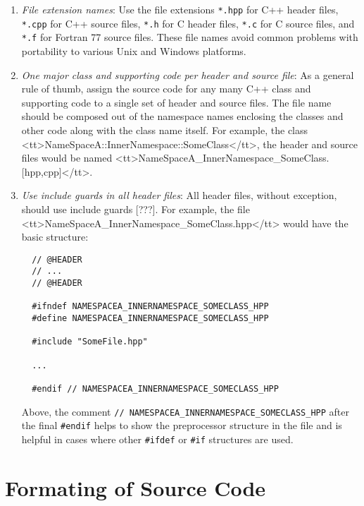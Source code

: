 \begin{enumerate}

{}\item\textit{File extension names}: Use the file extensions {}\texttt{*.hpp}
for C++ header files, {}\texttt{*.cpp} for C++ source files, {}\texttt{*.h}
for C header files, {}\texttt{*.c} for C source files, and {}\texttt{*.f} for
Fortran 77 source files.  These file names avoid common problems with
portability to various Unix and Windows platforms.

{}\item\textit{One major class and supporting code per header and source
file}: As a general rule of thumb, assign the source code for any many C++
class and supporting code to a single set of header and source files.  The
file name should be composed out of the namespace names enclosing the classes
and other code along with the class name itself.  For example, the class
<tt>NameSpaceA\-::InnerNamespace\-::SomeClass</tt>, the header and source
files would be named
<tt>NameSpaceA\-\_InnerNamespace\-\_SomeClass.[hpp,cpp]</tt>.

{}\item\textit{Use include guards in all header files}: All header files,
without exception, should use include guards [???].  For example, the file
<tt>NameSpaceA\-\_InnerNamespace\-\_SomeClass.hpp</tt> would have the basic
structure:

{\small\begin{verbatim}
  // @HEADER
  // ...
  // @HEADER

  #ifndef NAMESPACEA_INNERNAMESPACE_SOMECLASS_HPP
  #define NAMESPACEA_INNERNAMESPACE_SOMECLASS_HPP

  #include "SomeFile.hpp"

  ...

  #endif // NAMESPACEA_INNERNAMESPACE_SOMECLASS_HPP
\end{verbatim}}

Above, the comment {}\texttt{//
NAMESPACEA\-\_INNERNAMESPACE\-\_SOMECLASS\-\_HPP} after the final
{}\texttt{\#endif} helps to show the preprocessor structure in the file and is
helpful in cases where other {}\texttt{\#ifdef} or {}\texttt{\#if} structures
are used.

\end{enumerate}

%
\section{Formating of Source Code}
%

